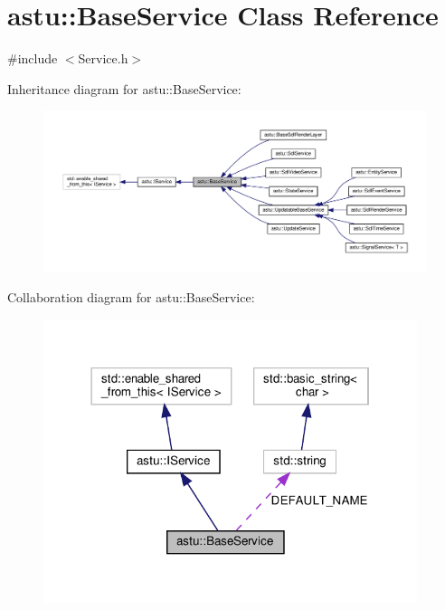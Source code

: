 \hypertarget{classastu_1_1BaseService}{}\section{astu\+:\+:Base\+Service Class Reference}
\label{classastu_1_1BaseService}


{\ttfamily \#include $<$Service.\+h$>$}



Inheritance diagram for astu\+:\+:Base\+Service\+:\nopagebreak
\begin{figure}[H]
\begin{center}
\leavevmode
\includegraphics[width=350pt]{classastu_1_1BaseService__inherit__graph}
\end{center}
\end{figure}


Collaboration diagram for astu\+:\+:Base\+Service\+:\nopagebreak
\begin{figure}[H]
\begin{center}
\leavevmode
\includegraphics[width=310pt]{classastu_1_1BaseService__coll__graph}
\end{center}
\end{figure}

